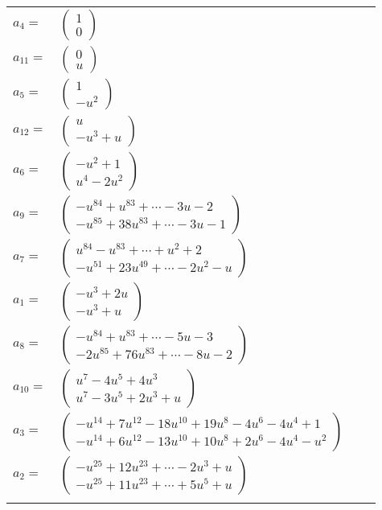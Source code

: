 \documentclass[1p]{elsarticle_modified}
\theoremstyle{definition}
\begin{document}
\begin{tabular}{m{7pt} m{180pt} m{7pt} m{180pt} }
\flushright $a_{4}=$&$\begin{pmatrix}1\\0\end{pmatrix}$ \\
\flushright $a_{11}=$&$\begin{pmatrix}0\\u\end{pmatrix}$ \\
\flushright $a_{5}=$&$\begin{pmatrix}1\\- u^2\end{pmatrix}$ \\
\flushright $a_{12}=$&$\begin{pmatrix}u\\- u^3+u\end{pmatrix}$ \\
\flushright $a_{6}=$&$\begin{pmatrix}- u^2+1\\u^4-2 u^2\end{pmatrix}$ \\
\flushright $a_{9}=$&$\begin{pmatrix}- u^{84}+u^{83}+\cdots-3 u-2\\- u^{85}+38 u^{83}+\cdots-3 u-1\end{pmatrix}$ \\
\flushright $a_{7}=$&$\begin{pmatrix}u^{84}- u^{83}+\cdots+u^2+2\\- u^{51}+23 u^{49}+\cdots-2 u^2- u\end{pmatrix}$ \\
\flushright $a_{1}=$&$\begin{pmatrix}- u^3+2 u\\- u^3+u\end{pmatrix}$ \\
\flushright $a_{8}=$&$\begin{pmatrix}- u^{84}+u^{83}+\cdots-5 u-3\\-2 u^{85}+76 u^{83}+\cdots-8 u-2\end{pmatrix}$ \\
\flushright $a_{10}=$&$\begin{pmatrix}u^7-4 u^5+4 u^3\\u^7-3 u^5+2 u^3+u\end{pmatrix}$ \\
\flushright $a_{3}=$&$\begin{pmatrix}- u^{14}+7 u^{12}-18 u^{10}+19 u^8-4 u^6-4 u^4+1\\- u^{14}+6 u^{12}-13 u^{10}+10 u^8+2 u^6-4 u^4- u^2\end{pmatrix}$ \\
\flushright $a_{2}=$&$\begin{pmatrix}- u^{25}+12 u^{23}+\cdots-2 u^3+u\\- u^{25}+11 u^{23}+\cdots+5 u^5+u\end{pmatrix}$\\&\end{tabular}
\end{document}
